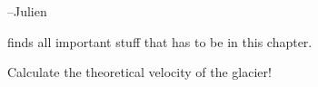 --Julien

finds all important stuff that has to be in this chapter. 



Calculate the theoretical velocity of the glacier!